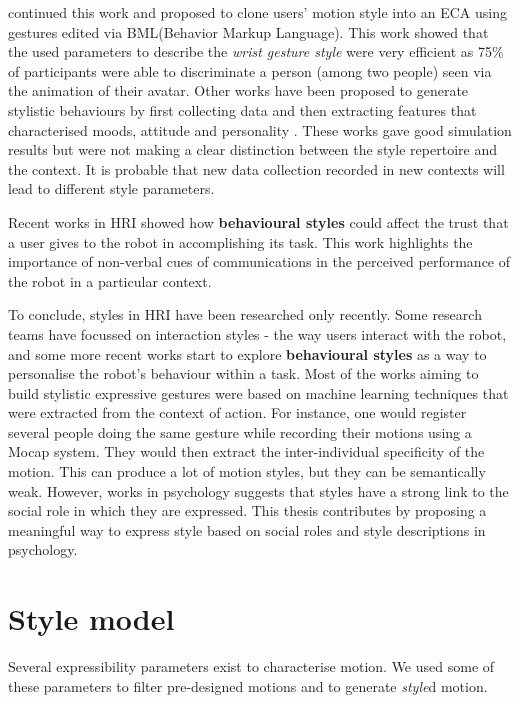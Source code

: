 \documentclass[smallextended]{svjour3}
\begin{document}
\cite{Rajagopal2012} continued this work and proposed to clone users' motion style into an ECA using gestures edited via BML(Behavior Markup Language).
This work showed that the used parameters to describe the \textit{wrist gesture style} were very efficient as 75\% of participants were able to discriminate a person (among two people) seen via the animation of their avatar.
Other works have been proposed to generate stylistic behaviours by first collecting data and then extracting features that characterised moods, attitude and personality \cite{Kang2013a,Czy2009}. 
These works gave good simulation results but were not making a clear distinction between the style repertoire and the context. 
It is probable that new data collection recorded in new contexts will lead to different style parameters.

Recent works in HRI showed how \textbf{behavioural styles} \cite{Ligthart2013,VandenBrule2014} could affect the trust that a user gives to the robot in accomplishing its task. 
This work highlights the importance of non-verbal cues of communications in the perceived performance of the robot in a particular context. 


To conclude, styles in HRI have been researched only recently. 
Some research teams have focussed on interaction styles - the way users interact with the robot, and some more recent works start to explore \textbf{behavioural styles} as a way to personalise the robot's behaviour within a task. 
Most of the works aiming to build stylistic expressive gestures were based on machine learning techniques that were extracted from the context of action. 
For instance, one would register several people doing the same gesture while recording their motions using a Mocap system.
They would then extract the inter-individual specificity of the motion.
This can produce a lot of motion styles, but they can be semantically weak.
However, works in psychology suggests that styles have a strong link to the social role in which they are expressed. 
This thesis contributes by proposing a meaningful way to express style based on social roles and style descriptions in psychology.

\section{Style model}
Several expressibility parameters exist to characterise motion. 
We used some of these parameters to filter pre-designed motions and to generate \textit{style}d motion.
\end{document}
